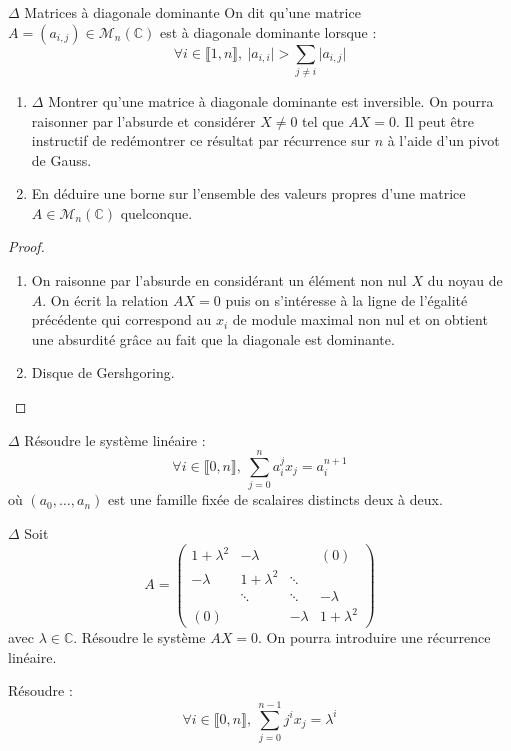 \documentclass[french,a4paper]{article}
\newcommand{\C}{\mathbb{C}}
\theoremstyle{plain}
\theoremstyle{definition}
\theoremstyle{remark}
\begin{document}
\begin{ex}{$\Delta$ Matrices à diagonale dominante}
	On dit qu'une matrice $A=(a_{i,j})\in\mathcal{M}_n(\C)$ est à diagonale dominante lorsque : $$\forall i\in\llbracket 1,n\rrbracket,\ \lvert a_{i,i}\rvert>\sum_{j\ne i}\lvert a_{i,j}\rvert$$
	\begin{enumerate}
		\item $\Delta$ Montrer qu'une matrice à diagonale dominante est inversible. On pourra raisonner par l'absurde et considérer $X\ne 0$ tel que $AX=0$. Il peut être instructif de redémontrer ce résultat par récurrence sur $n$ à l'aide d'un pivot de Gauss.
		\item En déduire une borne sur l'ensemble des valeurs propres d'une matrice $A\in\mathcal{M}_n(\C)$ quelconque.
	\end{enumerate}
\end{ex}
\begin{proof}
	\begin{enumerate}
		\item On raisonne par l'absurde en considérant un élément non nul $X$ du noyau de $A$. On écrit la relation $AX=0$ puis on s'intéresse à la ligne de l'égalité précédente qui correspond au $x_i$ de module maximal non nul et on obtient une absurdité grâce au fait que la diagonale est dominante.
		\item Disque de Gershgoring.
	\end{enumerate}
\end{proof}

\begin{ex}{$\Delta$}
	Résoudre le système linéaire : $$\forall i\in\llbracket0,n\rrbracket,\ \sum_{j=0}^{n}a_i^jx_j=a_i^{n+1}$$ où $(a_0,\ldots,a_n)$ est une famille fixée de scalaires distincts deux à deux.
\end{ex}

\begin{ex}{$\Delta$}
	Soit $$A=\begin{pmatrix}
		1+\lambda^2&-\lambda&&(0)\\
		-\lambda&1+\lambda^2&\ddots&\\
		&\ddots&\ddots&-\lambda\\
		(0)&&-\lambda&1+\lambda^2
	\end{pmatrix}$$ avec $\lambda\in\C$. Résoudre le système $AX=0$. On pourra introduire une récurrence linéaire.
\end{ex}

\begin{ex}{}
	Résoudre : $$\forall i\in\llbracket0,n\rrbracket,\ \sum_{j=0}^{n-1}j^ix_j=\lambda^i$$
\end{ex}
\end{document}
